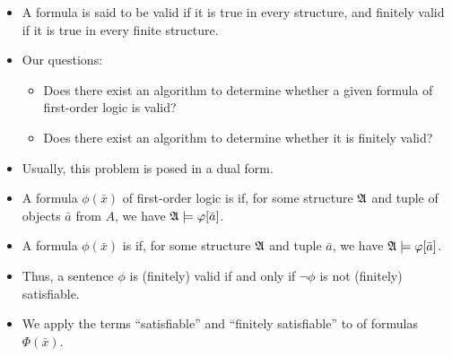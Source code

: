 \documentclass{beamer}
\begin{document}
\begin{frame}
	\begin{itemize}
		\item A formula is said to be {\color{blue} valid} if it is true in every structure, and {\color{blue} finitely valid} if it is true in every finite structure. 
		\item Our questions:
		\begin{itemize}
			\item Does there exist an {\color{blue} algorithm} to determine whether a given formula of first-order logic is valid? 
			\item Does there exist an algorithm to determine whether it is finitely valid?
		\end{itemize}
\end{itemize}
\end{frame}



\begin{frame}
	\begin{itemize}	
		\item Usually, this problem is posed in a dual form.
		\item A formula $\phi(\bar{x})$ of first-order logic 
		is  if, for some structure $\mathfrak{A}$ and tuple of objects $\bar{a}$ from $A$, we have $\mathfrak{A} \models \varphi[\bar{a}]$.
		\item A formula $\phi(\bar{x})$ is  if, for some  structure $\mathfrak{A}$ and tuple $\bar{a}$, we have $\mathfrak{A} \models \varphi[\bar{a}]$.
		\item Thus, a sentence $\phi$ is (finitely) valid if and only if $\neg \phi$ is not (finitely) satisfiable.
		\item We apply the terms ``satisfiable'' and ``finitely satisfiable'' to  of formulas $\Phi(\bar{x})$.
	\end{itemize}
\end{frame}
\end{document}
